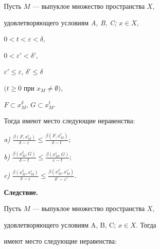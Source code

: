 \begin{lem}


Пусть $M$ --- выпуклое множество пространства $X$, 


удовлетворяющего условиям {\em A, B, C;} $x \in X$,


$0 < t < \varepsilon < \delta $,


$0 < \varepsilon ' < \delta '$,


$\varepsilon ' \leq \varepsilon $, $\delta ' \leq \delta$


$(t \geq 0$ при $x_{M} \neq \emptyset)$,


$F \subset x_{M}^{\delta }$, $G \subset x_{M}^{t}$.


Тогда имеют место следующие неравенства$:$





{\em a)}  $\frac{\beta (F,x_{M}^{\varepsilon })}{\delta - \varepsilon }\leq


\frac{\beta (F,x_{M}^{t})}{\delta - t};$


{\em b)} $\frac{\beta (x_{M}^{\delta },G)}{\delta - t} \leq


\frac{\beta (x_{M}^{\varepsilon },G)}{\varepsilon - t};$


{\em c)} $\frac{\beta (x_{M}^{\delta },x_{M}^{\varepsilon })}{\delta -


\varepsilon } \leq \frac{\beta (x_{M}^{\delta' },


x_{M}^{\varepsilon' })}{\delta' - \varepsilon' }$.


\end{lem}





{\bf Следствие.}


Пусть $M$ --- выпуклое множество пространства $X$, 


удовлетворяющего условиям A, B, C; $x \in X$. Тогда


имеют место следующие неравенства:


